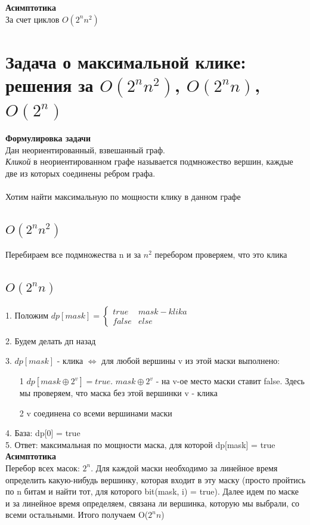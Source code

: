 \textbf{Асимптотика}
\\
За счет циклов $O(2^n n^2)$

\setcounter{section}{19}
\section{Задача о максимальной клике: решения за $O(2^nn^2)$, $O(2^nn)$, $O(2^n)$}
\textbf{Формулировка задачи} \\ Дан неориентированный, взвешанный граф.
\\
\textit{Кликой} в неориентированном графе называется подмножество вершин, каждые две из которых соединены ребром графа.
\\ 
\\ Хотим найти максимальную по мощности клику в данном графе

\subsection*{$O(2^nn^2)$}
Перебираем все подмножества n и за $n^2$ перебором проверяем, что это клика

\subsection*{$O(2^nn)$}
1. Положим $dp[mask] = \begin{cases}
   true &   mask - klika\\
   false &   else
 \end{cases}$

2. Будем делать дп назад

3. $dp[mask]$ - клика $\Longleftrightarrow$ для любой вершины v из этой маски выполнено:
\begin{itemize}
    \item [1] $dp[mask \oplus 2^v] = true$. $mask \oplus 2^v$ - на v-ое место маски ставит false. Здесь мы проверяем, что маска без этой вершинки v - клика 
    \item[2] v соединена со всеми вершинами маски
\end{itemize}
4. База: dp[0] =  true\\
5. Ответ: максимальная по мощности маска, для которой dp[mask] = true\\
\textbf{Асимптотика}\\
Перебор всех масок: $2^n$. Для каждой маски необходимо за линейное время определить какую-нибудь вершинку, которая входит в эту маску (просто пройтись по n битам и найти тот, для которого bit(mask, i) = true). Далее идем по маске и за линейное время определяем, связана ли вершинка, которую мы выбрали, со всеми остальными. Итого получаем  O($2^n n$)

